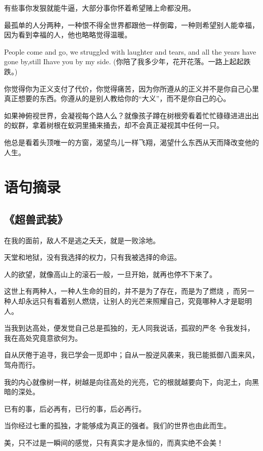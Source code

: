 \documentclass[UTF8,oneside]{ctexbook}
\begin{document}
\mfApache \quad 有些事你发狠就能牛逼，大部分事你怀着希望赌上命都没用。

\mfApache \quad 最孤单的人分两种，一种恨不得全世界都跟他一样倒霉，一种则希望别人能幸福，因为看到幸福的人，他也略略觉得温暖。

\mfApache \quad People come and go, we struggled with laughter and tears, 
and all the years have gone by,still Ihave you by my side. 
(你陪了我多少年，花开花落。一路上起起跌跌。)

\mfApache \quad 你觉得你为正义支付了代价，你觉得痛苦，因为你所遵从的正义并不是你自己心里真正想要的东西。你遵从的是别人教给你的“大义”，而不是你自己的心。

\mfApache \quad 如果神俯视世界，会凝视每个路人么？就像孩子蹲在树根旁看着忙忙碌碌进进出出的蚁群，拿着树根在蚁洞里捅来捅去，却不会真正凝视其中任何一只。

\mfApache \quad 他总是看着头顶唯一的方窗，渴望鸟儿一样飞翔，渴望什么东西从天而降改变他的人生。
\chapter{语句摘录}
\section{《超兽武装》}
\mfApache \quad 在我的面前，敌人不是逃之夭夭，就是一败涂地。

\mfApache \quad 天堂和地狱，没有我选择的权力，只有我被选择的命运。

\mfApache \quad 人的欲望，就像高山上的滚石一般，一旦开始，就再也停不下来了。

\mfApache \quad 这世上有两种人，一种人生命的目的，并不是为了存在，而是为了燃烧
，而另一种人却永远只有看着别人燃烧，让别人的光芒来照耀自己，究竟哪种人才是聪明人。

\mfApache \quad 当我到达高处，便发觉自己总是孤独的，无人同我说话，孤寂的严冬
令我发抖，我在高处究竟意欲何为。

\mfApache \quad 自从厌倦于追寻，我已学会一觅即中；自从一股逆风袭来，我已能抵御八面来风，驾舟而行。

\mfApache \quad 我的内心就像树一样，树越是向往高处的光亮，它的根就越要向下，向泥土，向黑暗的深处。

\mfApache \quad 已有的事，后必再有，已行的事，后必再行。

\mfApache \quad 当你经过七重的孤独，才能够成为真正的强者。我们的世界也由此而生。

\mfApache \quad 美，只不过是一瞬间的感觉，只有真实才是永恒的，而真实绝不会美！
\end{document}
